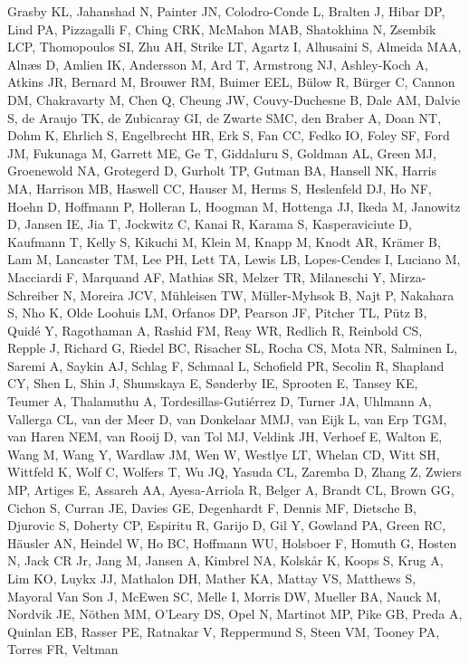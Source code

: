 \documentclass[
]{article}
\begin{document}
Grasby KL, Jahanshad N, Painter JN, Colodro-Conde L, Bralten J, Hibar
DP, Lind PA, Pizzagalli F, Ching CRK, McMahon MAB, Shatokhina N, Zsembik
LCP, Thomopoulos SI, Zhu AH, Strike LT, Agartz I, Alhusaini S, Almeida
MAA, Alnæs D, Amlien IK, Andersson M, Ard T, Armstrong NJ, Ashley-Koch
A, Atkins JR, Bernard M, Brouwer RM, Buimer EEL, Bülow R, Bürger C,
Cannon DM, Chakravarty M, Chen Q, Cheung JW, Couvy-Duchesne B, Dale AM,
Dalvie S, de Araujo TK, de Zubicaray GI, de Zwarte SMC, den Braber A,
Doan NT, Dohm K, Ehrlich S, Engelbrecht HR, Erk S, Fan CC, Fedko IO,
Foley SF, Ford JM, Fukunaga M, Garrett ME, Ge T, Giddaluru S, Goldman
AL, Green MJ, Groenewold NA, Grotegerd D, Gurholt TP, Gutman BA, Hansell
NK, Harris MA, Harrison MB, Haswell CC, Hauser M, Herms S, Heslenfeld
DJ, Ho NF, Hoehn D, Hoffmann P, Holleran L, Hoogman M, Hottenga JJ,
Ikeda M, Janowitz D, Jansen IE, Jia T, Jockwitz C, Kanai R, Karama S,
Kasperaviciute D, Kaufmann T, Kelly S, Kikuchi M, Klein M, Knapp M,
Knodt AR, Krämer B, Lam M, Lancaster TM, Lee PH, Lett TA, Lewis LB,
Lopes-Cendes I, Luciano M, Macciardi F, Marquand AF, Mathias SR, Melzer
TR, Milaneschi Y, Mirza-Schreiber N, Moreira JCV, Mühleisen TW,
Müller-Myhsok B, Najt P, Nakahara S, Nho K, Olde Loohuis LM, Orfanos DP,
Pearson JF, Pitcher TL, Pütz B, Quidé Y, Ragothaman A, Rashid FM, Reay
WR, Redlich R, Reinbold CS, Repple J, Richard G, Riedel BC, Risacher SL,
Rocha CS, Mota NR, Salminen L, Saremi A, Saykin AJ, Schlag F, Schmaal L,
Schofield PR, Secolin R, Shapland CY, Shen L, Shin J, Shumskaya E,
Sønderby IE, Sprooten E, Tansey KE, Teumer A, Thalamuthu A,
Tordesillas-Gutiérrez D, Turner JA, Uhlmann A, Vallerga CL, van der Meer
D, van Donkelaar MMJ, van Eijk L, van Erp TGM, van Haren NEM, van Rooij
D, van Tol MJ, Veldink JH, Verhoef E, Walton E, Wang M, Wang Y, Wardlaw
JM, Wen W, Westlye LT, Whelan CD, Witt SH, Wittfeld K, Wolf C, Wolfers
T, Wu JQ, Yasuda CL, Zaremba D, Zhang Z, Zwiers MP, Artiges E, Assareh
AA, Ayesa-Arriola R, Belger A, Brandt CL, Brown GG, Cichon S, Curran JE,
Davies GE, Degenhardt F, Dennis MF, Dietsche B, Djurovic S, Doherty CP,
Espiritu R, Garijo D, Gil Y, Gowland PA, Green RC, Häusler AN, Heindel
W, Ho BC, Hoffmann WU, Holsboer F, Homuth G, Hosten N, Jack CR Jr, Jang
M, Jansen A, Kimbrel NA, Kolskår K, Koops S, Krug A, Lim KO, Luykx JJ,
Mathalon DH, Mather KA, Mattay VS, Matthews S, Mayoral Van Son J, McEwen
SC, Melle I, Morris DW, Mueller BA, Nauck M, Nordvik JE, Nöthen MM,
O'Leary DS, Opel N, Martinot MP, Pike GB, Preda A, Quinlan EB, Rasser
PE, Ratnakar V, Reppermund S, Steen VM, Tooney PA, Torres FR, Veltman
\end{document}
